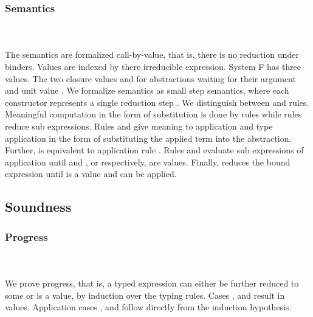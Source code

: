 \subsubsection{Semantics}\hfill\\\\
The semantics are formalized call-by-value, that is, there is no reduction under binders. Values are indexed by there irreducible expression.
\FVal
System F has three values. The two closure values  and  for abstractions waiting for their argument and unit value .
We formalize semantics as small step semantics, where each constructor represents a single reduction step   .
We distinguish between  and  rules. Meaningful computation in the form of substitution is done by  rules while  rules reduce sub expressions.
\FSemantics
Rules  and  give meaning to application and type application in the form of substituting the applied term into the abstraction. Further,  is equivalent to application rule . Rules  and  evaluate sub expressions of application until  and , or  respectively, are values. Finally,  reduces the bound expression  until  is a value and  can be applied.    
\subsection{Soundness}

\subsubsection{Progress}\hfill\\\\
We prove progress, that is, a typed expression    \Data{:}  can either be further reduced to some  or  is a value, by induction over the typing rules. 
\FProgress
Cases ,  and  result in values. Application cases ,  and  follow directly from the induction hypothesis. 
